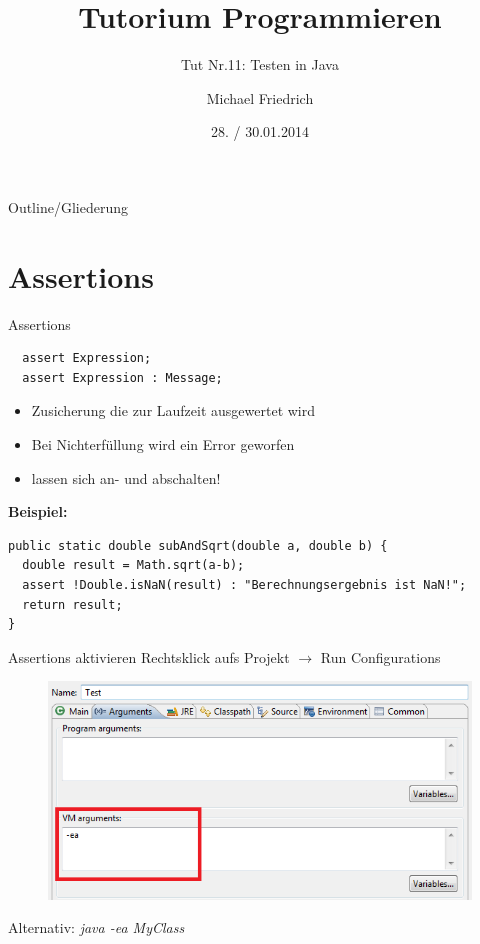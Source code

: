\documentclass[18pt]{beamer}
\title[Prog Tut Nr. 11]{Tutorium Programmieren}
\subtitle{Tut Nr.11: Testen in Java}
\author{Michael Friedrich}
\date{28. / 30.01.2014}
\institute{Institut f\"ur theoretische Informatik}
\begin{document}

\begin{frame}
        \titlepage
\end{frame}

\begin{frame}{Outline/Gliederung}
  \tableofcontents
\end{frame}

\section{Assertions}
\begin{frame}[fragile]{Assertions}
  \begin{lstlisting}
  assert Expression;
  assert Expression : Message;\end{lstlisting}
  \pause
  \begin{itemize}
    \item Zusicherung die zur Laufzeit ausgewertet wird
    \item Bei Nichterfüllung wird ein Error geworfen
    \item lassen sich an- und abschalten!
  \end{itemize}
  \pause
  \textbf{Beispiel:}
        \begin{lstlisting}
public static double subAndSqrt(double a, double b) {
  double result = Math.sqrt(a-b);
  assert !Double.isNaN(result) : "Berechnungsergebnis ist NaN!";
  return result;
}\end{lstlisting}
\end{frame}

\begin{frame}[fragile]{Assertions aktivieren}
  Rechtsklick aufs Projekt $\rightarrow$ Run Configurations
        \begin{figure}%
  \includegraphics[width=0.8\columnwidth]{vmarg.png}%
  \end{figure}
  Alternativ: \hspace{1cm} \textit{java -ea MyClass}
\end{frame}
\end{document}
